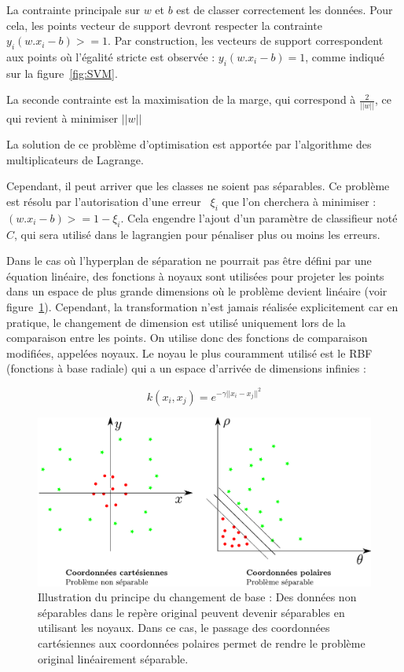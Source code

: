 La contrainte principale sur $w$ et $b$ est de classer correctement les données. Pour cela, les points vecteur de support devront respecter la contrainte $y_i ( w . x_i - b ) >= 1$. Par construction, les vecteurs de support correspondent aux points où l'égalité stricte est observée : $y_i ( w . x_i - b ) = 1$, comme indiqué sur la figure~\ref{fig:SVM}.

La seconde contrainte est la maximisation de la marge, qui correspond à  $\frac{2}{||w||}$, ce qui revient à minimiser $||w||$

La solution de ce problème d'optimisation est apportée par l'algorithme des multiplicateurs de Lagrange. 

Cependant, il peut arriver que les classes ne soient pas séparables. Ce problème est résolu par l'autorisation d'une erreur~\cite{cortes1995support} $\xi_i$  que l'on cherchera à minimiser : $( w . x_i - b ) >= 1 - \xi_i $. Cela engendre l'ajout d'un paramètre de classifieur noté $C$, qui sera utilisé dans le lagrangien pour pénaliser plus ou moins les erreurs.

Dans le cas où l'hyperplan de séparation ne pourrait pas être défini par une équation linéaire, des fonctions à noyaux sont utilisées pour projeter les points dans un espace de plus grande dimensions où le problème devient linéaire (voir figure~\ref{fig:kernelTrick}). Cependant, la transformation n'est jamais réalisée explicitement car en pratique, le changement de dimension est utilisé uniquement lors de la comparaison entre les points. On utilise donc des fonctions de comparaison modifiées, appelées noyaux. Le noyau le plus couramment utilisé est le RBF (fonctions à base radiale) qui a un espace d'arrivée de dimensions infinies :

\[ 
k(x_i,x_j)=e^{-\gamma||x_i-x_j||^2}  
\]

\begin{figure}[h]
	\begin{center}
	\includegraphics[width=15cm]{images/kernelTrick}
	\end{center}
	\caption[Changement de base pour les SVM]{Illustration du principe du changement de base : Des données non séparables dans le repère original peuvent devenir séparables en utilisant les noyaux. Dans ce cas, le passage des coordonnées cartésiennes aux coordonnées polaires permet de rendre le problème original linéairement séparable.}
	\label{fig:kernelTrick}
\end{figure}



